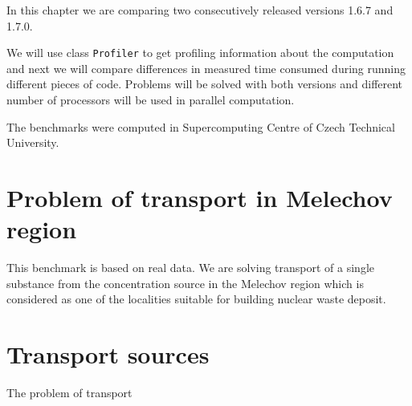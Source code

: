 %
%
%
%
%
%
%
%


In this chapter we are comparing two consecutively released versions 1.6.7 and 1.7.0. 

We will use class \verb'Profiler' to get profiling information about the computation 
and next we will compare differences in measured time consumed during running different 
pieces of code. Problems will be solved with both versions and different number 
of processors will be used in parallel computation.

The benchmarks were computed in Supercomputing Centre of Czech Technical University.


\section{Problem of transport in Melechov region}

This benchmark is based on real data. We are solving transport of a single 
substance from the concentration source in the Melechov region which is considered as
one of the localities suitable for building nuclear waste deposit.



\section{Transport sources}
The problem of transport 

